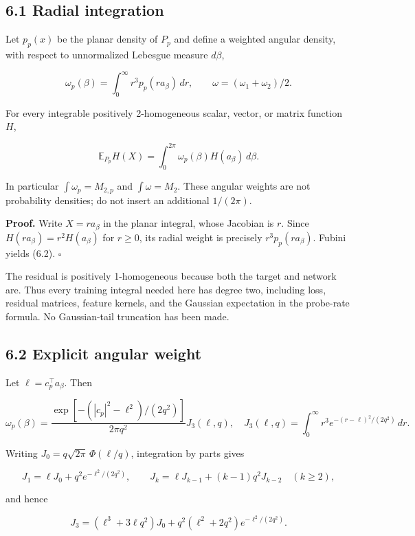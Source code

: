 \documentclass[
  10pt,
]{article}
\begin{document}
\subsection{6.1 Radial integration}\label{radial-integration}

Let \(p_p(x)\) be the planar density of \(P_p\) and define a weighted
angular density, with respect to unnormalized Lebesgue measure
\(d\beta\),

\[
 \omega_p(\beta)=\int_0^\infty r^3p_p(r a_\beta)\,dr,
 \qquad \omega=(\omega_1+\omega_2)/2.
 \tag{6.1}
\]

For every integrable positively 2-homogeneous scalar, vector, or matrix
function \(H\),

\[
 \mathbb E_{P_p}H(X)=\int_0^{2\pi}\omega_p(\beta)H(a_\beta)\,d\beta.
 \tag{6.2}
\]

In particular \(\int\omega_p=M_{2,p}\) and \(\int\omega=M_2\). These
angular weights are not probability densities; do not insert an
additional \(1/(2\pi)\).

\textbf{Proof.} Write \(X=r a_\beta\) in the planar integral, whose
Jacobian is \(r\). Since \(H(r a_\beta)=r^2H(a_\beta)\) for \(r\ge0\),
its radial weight is precisely \(r^3p_p(r a_\beta)\). Fubini yields
(6.2). \(\square\)

The residual is positively 1-homogeneous because both the target and
network are. Thus every training integral needed here has degree two,
including loss, residual matrices, feature kernels, and the Gaussian
expectation in the probe-rate formula. No Gaussian-tail truncation has
been made.

\subsection{6.2 Explicit angular weight}\label{explicit-angular-weight}

Let \(\ell=c_p^\top a_\beta\). Then

\[
 \omega_p(\beta)=
 \frac{\exp[-(|c_p|^2-\ell^2)/(2q^2)]}{2\pi q^2}J_3(\ell,q),
 \quad
 J_3(\ell,q)=\int_0^\infty r^3e^{-(r-\ell)^2/(2q^2)}\,dr.
 \tag{6.3}
\]

Writing \(J_0=q\sqrt{2\pi}\,\Phi(\ell/q)\), integration by parts gives

\[
 J_1=\ell J_0+q^2e^{-\ell^2/(2q^2)},\qquad
 J_k=\ell J_{k-1}+(k-1)q^2J_{k-2}\quad(k\ge2),
\]

and hence

\[
 J_3=(\ell^3+3\ell q^2)J_0+
 q^2(\ell^2+2q^2)e^{-\ell^2/(2q^2)}.
 \tag{6.4}
\]
\end{document}
